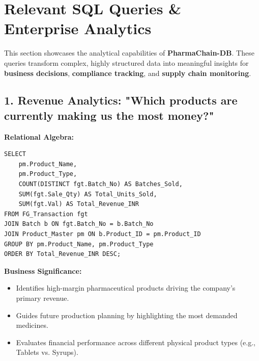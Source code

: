 \documentclass[12pt, a4paper]{article}
\begin{document}
\newpage
\section{Relevant SQL Queries \& Enterprise Analytics}
This section showcases the analytical capabilities of \textbf{PharmaChain-DB}. These queries transform complex, highly structured data into meaningful insights for \textbf{business decisions}, \textbf{compliance tracking}, and \textbf{supply chain monitoring}.


\subsection*{1. Revenue Analytics: "Which products are currently making us the most money?"}

\textbf{Relational Algebra:}
\vspace{0.2cm}\\
\noindent{}
\vspace{0.2cm}

\begin{lstlisting}
SELECT 
    pm.Product_Name,
    pm.Product_Type,
    COUNT(DISTINCT fgt.Batch_No) AS Batches_Sold,
    SUM(fgt.Sale_Qty) AS Total_Units_Sold,
    SUM(fgt.Val) AS Total_Revenue_INR
FROM FG_Transaction fgt
JOIN Batch b ON fgt.Batch_No = b.Batch_No
JOIN Product_Master pm ON b.Product_ID = pm.Product_ID
GROUP BY pm.Product_Name, pm.Product_Type
ORDER BY Total_Revenue_INR DESC;
\end{lstlisting}

\textbf{Business Significance:}
\begin{itemize}
    \item[$\rightarrow$] Identifies high-margin pharmaceutical products driving the company's primary revenue.
    \item[$\rightarrow$] Guides future production planning by highlighting the most demanded medicines.
    \item[$\rightarrow$] Evaluates financial performance across different physical product types (e.g., Tablets vs. Syrups).
\end{itemize}
\end{document}
